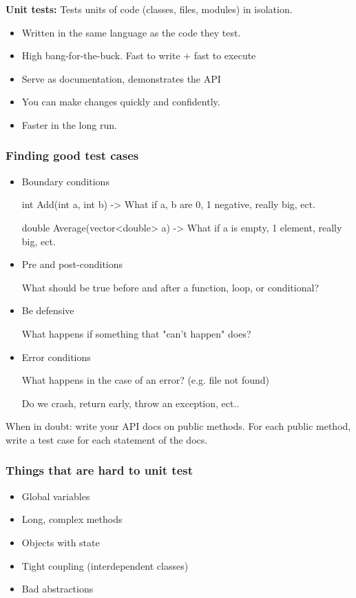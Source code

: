 \documentclass{article}
\begin{document}
\textbf{Unit tests: } Tests units of code (classes, files, modules) in isolation.
\begin{itemize}
    \item Written in the same language as the code they test.
    \item High bang-for-the-buck.
    Fast to write + fast to execute
    \item Serve as documentation, demonstrates the API
    \item You can make changes quickly and confidently.
    \item Faster in the long run.
\end{itemize}

\subsubsection*{Finding good test cases}
\begin{itemize}
    \item Boundary conditions\par
    int Add(int a, int b) -> What if a, b are 0, 1 negative, really big, ect.\par
    double Average(vector<double> a) -> What if a is empty, 1 element, really big, ect.
    \item Pre and post-conditions\par
    What should be true before and after a function, loop, or conditional?
    \item Be defensive\par
    What happens if something that "can't happen" does?
    \item Error conditions\par
    What happens in the case of an error? (e.g. file not found)\par
    Do we crash, return early, throw an exception, ect..
\end{itemize}

When in doubt: write your API docs on public methods. For each public method, write a test case for each statement of the docs.

\subsubsection*{Things that are hard to unit test}
\begin{itemize}
    \item Global variables
    \item Long, complex methods
    \item Objects with state
    \item Tight coupling (interdependent classes)
    \item Bad abstractions
\end{itemize}
\end{document}

